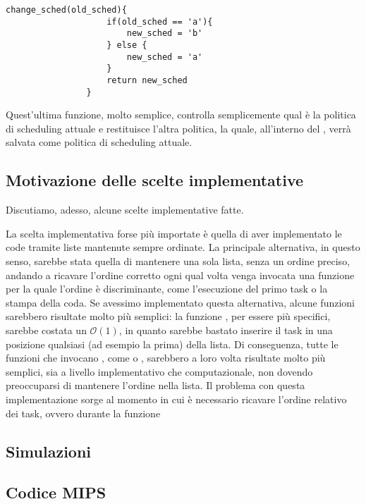         \begin{center}
            \begin{lstlisting}[language=pseudo, gobble=14]
                change_sched(old_sched){
                    if(old_sched == 'a'){
                        new_sched = 'b'
                    } else {
                        new_sched = 'a'
                    }
                    return new_sched
                }\end{lstlisting}
        \end{center}
        
        Quest'ultima funzione, molto semplice, controlla semplicemente qual è la politica di scheduling attuale e restituisce l'altra politica, la quale, all'interno del , verrà salvata come politica di scheduling attuale.
    
    \subsection*{Motivazione delle scelte implementative}
    
        Discutiamo, adesso, alcune scelte implementative fatte.
        
        La scelta implementativa forse più importate è quella di aver implementato le code tramite liste mantenute sempre ordinate. La principale alternativa, in questo senso, sarebbe stata quella di mantenere una sola lista, senza un ordine preciso, andando a ricavare l'ordine corretto ogni qual volta venga invocata una funzione per la quale l'ordine è discriminante, come l'esecuzione del primo task o la stampa della coda. Se avessimo implementato questa alternativa, alcune funzioni sarebbero risultate molto più semplici: la funzione , per essere più specifici, sarebbe costata un $\mathcal{O}(1)$, in quanto sarebbe bastato inserire il task in una posizione qualsiasi (ad esempio la prima) della lista. Di conseguenza, tutte le funzioni che invocano , come  o , sarebbero a loro volta risultate molto più semplici, sia a livello implementativo che computazionale, non dovendo preoccuparsi di mantenere l'ordine nella lista. Il problema con questa implementazione sorge al momento in cui è necessario ricavare l'ordine relativo dei task, ovvero durante la funzione 
    
    \subsection*{Simulazioni}
    
    \subsection*{Codice MIPS}
